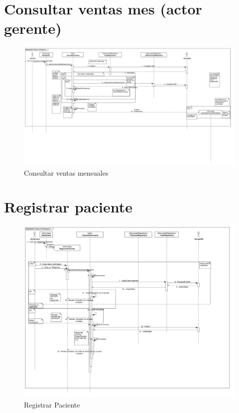 \section{Consultar ventas mes (actor gerente)}
\begin{figure}[htbp!]
		\centering
			\includegraphics[width=1\textwidth]{uml/DiagramasSecuencia/RubenMurga/getVentasMes}
		\caption{Consultar ventas mensuales}
	\end{figure}
\newpage
\section{Registrar paciente}
\begin{figure}[htbp!]
		\centering
			\includegraphics[width=1\textwidth]{uml/DiagramasSecuencia/RubenMurga/insertPaciente}
		\caption{Registrar Paciente}
	\end{figure}